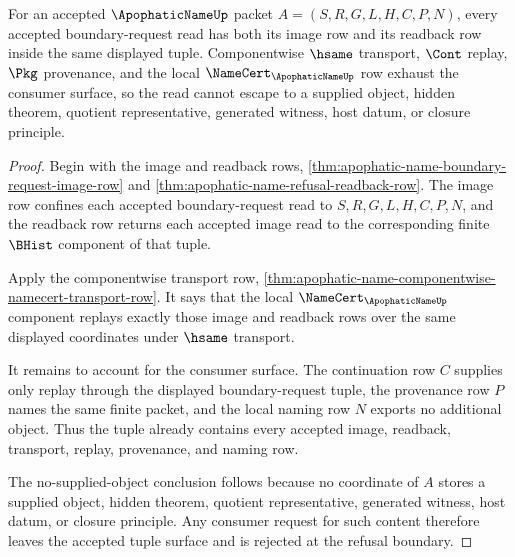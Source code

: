 \begin{theorem}
\label{thm:apophatic-name-boundary-request-tuple-totality}
For an accepted $\ApophaticNameUp$ packet $A=(S,R,G,L,H,C,P,N)$, every accepted boundary-request read has both its image row and its readback row inside the same displayed tuple. Componentwise $\hsame$ transport, $\Cont$ replay, $\Pkg$ provenance, and the local $\NameCert_{\ApophaticNameUp}$ row exhaust the consumer surface, so the read cannot escape to a supplied object, hidden theorem, quotient representative, generated witness, host datum, or closure principle.
\end{theorem}
\begin{proof}
Begin with the image and readback rows, \autoref{thm:apophatic-name-boundary-request-image-row} and \autoref{thm:apophatic-name-refusal-readback-row}. The image row confines each accepted boundary-request read to $S,R,G,L,H,C,P,N$, and the readback row returns each accepted image read to the corresponding finite $\BHist$ component of that tuple.

Apply the componentwise transport row, \autoref{thm:apophatic-name-componentwise-namecert-transport-row}. It says that the local $\NameCert_{\ApophaticNameUp}$ component replays exactly those image and readback rows over the same displayed coordinates under $\hsame$ transport.

It remains to account for the consumer surface. The continuation row $C$ supplies only replay through the displayed boundary-request tuple, the provenance row $P$ names the same finite packet, and the local naming row $N$ exports no additional object. Thus the tuple already contains every accepted image, readback, transport, replay, provenance, and naming row.

The no-supplied-object conclusion follows because no coordinate of $A$ stores a supplied object, hidden theorem, quotient representative, generated witness, host datum, or closure principle. Any consumer request for such content therefore leaves the accepted tuple surface and is rejected at the refusal boundary.
\end{proof}

